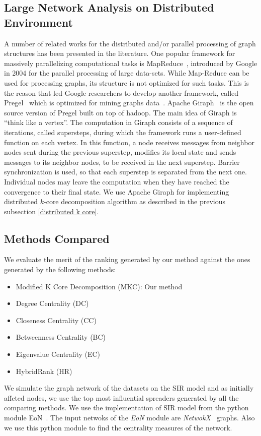 \documentclass[sigconf]{acmart}
\begin{document}
\subsection{Large Network Analysis on Distributed Environment}
A number of related works for the distributed and/or parallel processing of graph structures has been presented in the literature. One popular framework for massively parallelizing
computational tasks is MapReduce~\cite{dean2008mapreduce}, introduced by Google in 2004 for the parallel processing of large data-sets. While Map-Reduce can be used for processing graphs, its structure is not optimized for such tasks. This is the reason that led Google researchers to develop another framework, called Pregel~\cite{malewicz2010pregel} which is optimized for mining graphs data~\cite{han2014experimental}. Apache Giraph~\cite{martella2012apache,martella2015practical} is the open source version of Pregel built on top of hadoop. The main idea of Giraph is ``think like a vertex''. The computation in Giraph consists of a sequence of iterations, called supersteps, during which the framework runs a user-defined function on each vertex. In this function, a node receives messages from neighbor nodes sent during the previous superstep, modifies its local state and sends messages to its neighbor nodes, to be received in the next superstep. Barrier synchronization is used, so that each superstep is separated from the next one. Individual nodes may leave the computation when they have reached the convergence to their final state.
We use Apache Giraph for implementing distributed $k$-core decomposition algorithm as described in the previous subsection \ref{distributed k core}.


\subsection{Methods Compared}
We  evaluate the merit of the ranking generated by our method against the ones generated by the following methods: 
\begin{itemize}
	\item Modified K Core Decomposition (MKC): Our method
	\item Degree Centrality (DC)
	\item Closeness Centrality (CC)
	\item Betweenness Centrality (BC)
	\item Eigenvalue Centrality (EC)
	\item HybridRank (HR)
\end{itemize}
We simulate the graph network of the datasets on the SIR model and as initially affcted nodes, we use 
the top most influential spreaders generated by all the comparing methods. We use the implementation of SIR model from the python module EoN~\cite{eon}. The input netwoks of the \textit{EoN} module are \textit{NetwokX}~\cite{networkx} graphs. Also we use this python module to find the centrality measures of the network. 
\end{document}
